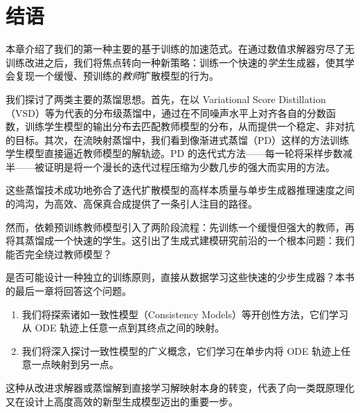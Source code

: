 \newpage
\section{结语}\label{sec:ch10_cr}

本章介绍了我们的第一种主要的基于训练的加速范式。在通过数值求解器穷尽了无训练改进之后，我们将焦点转向一种新策略：训练一个快速的\textit{学生}生成器，使其学会复现一个缓慢、预训练的\textit{教师}扩散模型的行为。

我们探讨了两类主要的蒸馏思想。首先，在以 Variational Score Distillation（VSD）等为代表的分布级蒸馏中，通过在不同噪声水平上对齐各自的分数函数，训练学生模型的输出分布去匹配教师模型的分布，从而提供一个稳定、非对抗的目标。其次，在流映射蒸馏中，我们看到像渐进式蒸馏（PD）这样的方法训练学生模型直接逼近教师模型的解轨迹。PD 的迭代式方法——每一轮将采样步数减半——被证明是将一个漫长的迭代过程压缩为少数几步的强大而实用的方法。

这些蒸馏技术成功地弥合了迭代扩散模型的高样本质量与单步生成器推理速度之间的鸿沟，为高效、高保真合成提供了一条引人注目的路径。

然而，依赖预训练教师模型引入了两阶段流程：先训练一个缓慢但强大的教师，再将其蒸馏成一个快速的学生。这引出了生成式建模研究前沿的一个根本问题：我们能否完全绕过教师模型？

是否可能设计一种独立的训练原则，直接从数据学习这些快速的少步生成器？本书的最后一章将回答这个问题。
\begin{enumerate}
    \item 我们将探索诸如一致性模型（Consistency Models）等开创性方法，它们学习从 ODE 轨迹上任意一点到其终点之间的映射。
    \item 我们将深入探讨一致性模型的广义概念，它们学习在单步内将 ODE 轨迹上任意一点映射到另一点。
\end{enumerate}

这种从改进求解器或蒸馏解到直接学习解映射本身的转变，代表了向一类既原理化又在设计上高度高效的新型生成模型迈出的重要一步。

\clearpage
\newpage

